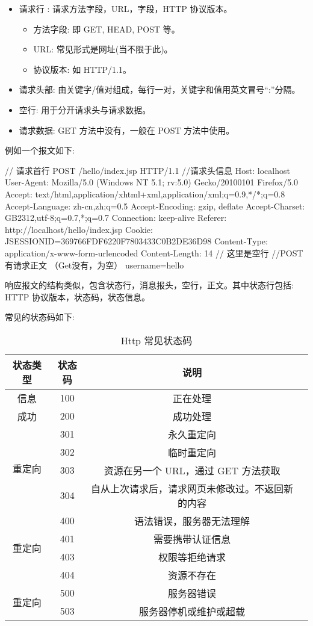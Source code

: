 \begin{itemize}
  \item 请求行 : 请求方法字段，URL，字段，HTTP 协议版本。
  \begin{itemize}
    \item 方法字段: 即 GET, HEAD, POST 等。
    \item URL: 常见形式是网址(当不限于此)。
    \item 协议版本: 如 HTTP/1.1。
  \end{itemize}
  \item 请求头部: 由关键字/值对组成，每行一对，关键字和值用英文冒号“:”分隔。
  \item 空行: 用于分开请求头与请求数据。
  \item 请求数据: GET 方法中没有，一般在 POST 方法中使用。
\end{itemize}

例如一个报文如下:
\begin{HTML}
// 请求首行
POST /hello/index.jsp HTTP/1.1
//请求头信息
Host: localhost
User-Agent: Mozilla/5.0 (Windows NT 5.1; rv:5.0) Gecko/20100101 Firefox/5.0
Accept: text/html,application/xhtml+xml,application/xml;q=0.9,*/*;q=0.8
Accept-Language: zh-cn,zh;q=0.5
Accept-Encoding: gzip, deflate
Accept-Charset: GB2312,utf-8;q=0.7,*;q=0.7
Connection: keep-alive
Referer: http://localhost/hello/index.jsp
Cookie: JSESSIONID=369766FDF6220F7803433C0B2DE36D98
Content-Type: application/x-www-form-urlencoded 
Content-Length: 14 
// 这里是空行
//POST有请求正文 （Get没有，为空）
username=hello
\end{HTML}

响应报文的结构类似，包含状态行，消息报头，空行，正文。其中状态行包括: HTTP 协议版本，状态码，状态信息。

常见的状态码如下:
\begin{table}[H]
  \small
  \centering
  \caption{Http 常见状态码}
  \label{table:Http 常见状态码}
  \setlength{\tabcolsep}{4mm}
  \begin{tabular}{c|ccc}
    \toprule
    \textbf{状态类型} & \textbf{状态码} & \textbf{说明} \\
    \midrule
    \multirow{1}{*}{信息} & 100 & 正在处理 \\
    \midrule
    \multirow{1}{*}{成功} & 200 & 成功处理 \\
    \midrule
    \multirow{4}{*}{重定向} & 301 & 永久重定向 \\
     & 302 & 临时重定向 \\
     & 303 & 资源在另一个 URL，通过 GET 方法获取 \\
     & 304 & 自从上次请求后，请求网页未修改过。不返回新的内容 \\
    \midrule
    \multirow{4}{*}{重定向} & 400 & 语法错误，服务器无法理解 \\
     & 401 & 需要携带认证信息 \\
     & 403 & 权限等拒绝请求 \\
     & 404 & 资源不存在 \\
    \midrule
    \multirow{2}{*}{重定向} & 500 & 服务器错误 \\
     & 503 & 服务器停机或维护或超载 \\
    \bottomrule
  \end{tabular}
\end{table}

